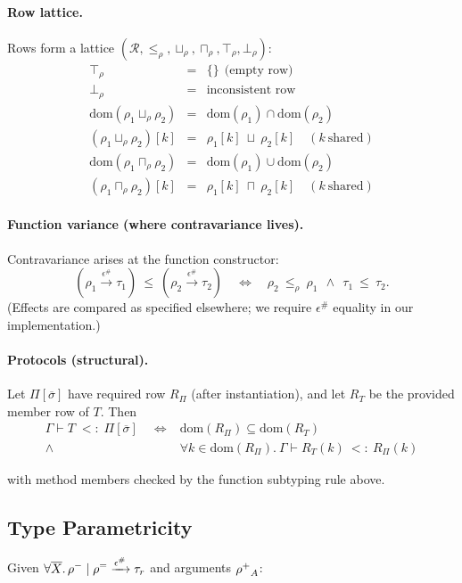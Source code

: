 \paragraph{Row lattice.}
Rows form a lattice $(\mathcal{R}, \le_\rho, \sqcup_\rho, \sqcap_\rho, \top_\rho, \bot_\rho)$:
\[
\begin{array}{lcl}
\top_\rho &=& \{\}\ \ \text{(empty row)}\\[0.2em]
\bot_\rho &=& \text{inconsistent row}\\[0.2em]
\mathrm{dom}(\rho_1 \sqcup_\rho \rho_2) &=& \mathrm{dom}(\rho_1)\cap\mathrm{dom}(\rho_2)\\
(\rho_1 \sqcup_\rho \rho_2)[k] &=& \rho_1[k]\ \sqcup\ \rho_2[k]\quad (k\ \text{shared})\\[0.2em]
\mathrm{dom}(\rho_1 \sqcap_\rho \rho_2) &=& \mathrm{dom}(\rho_1)\cup\mathrm{dom}(\rho_2)\\
(\rho_1 \sqcap_\rho \rho_2)[k] &=& \rho_1[k]\ \sqcap\ \rho_2[k]\quad (k\ \text{shared})
\end{array}
\]

\paragraph{Function variance (where contravariance lives).}
Contravariance arises at the function constructor:
\[
(\rho_1 \xrightarrow{\epsilon^\#} \tau_1)\ \le\ (\rho_2 \xrightarrow{\epsilon^\#} \tau_2)
\quad\iff\quad
\rho_2\ \le_\rho\ \rho_1\ \ \wedge\ \ \tau_1\ \le\ \tau_2.
\]
(Effects are compared as specified elsewhere; we require $\epsilon^\#$ equality in our implementation.)

\paragraph{Protocols (structural).}
Let $\Pi[\overline{\sigma}]$ have required row $R_\Pi$ (after instantiation), and let $R_T$ be the provided member row of $T$.
Then
\begin{align*}
\Gamma \vdash T \;<:\; \Pi[\overline{\sigma}] \quad\iff & \mathrm{dom}(R_\Pi)\subseteq \mathrm{dom}(R_T) \\
\wedge \; & \forall k\in\mathrm{dom}(R_\Pi).\ \Gamma \vdash R_T(k)\ <: \ R_\Pi(k)
\end{align*}

with method members checked by the function subtyping rule above.

\subsection{Type Parametricity}
Given $\forall\overline{X}.\,\mathord{\rho^{-}} \mid \mathord{\rho^{=}} \xrightarrow{\epsilon^\#} \tau_r$ and arguments $\mathord{\rho^{+}}_A$:

